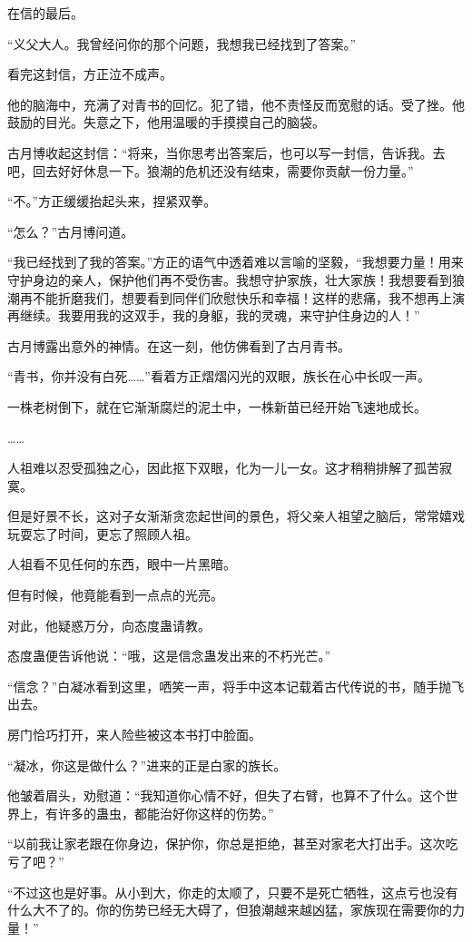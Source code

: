 \begin{this_body}
在信的最后。

“义父大人。我曾经问你的那个问题，我想我已经找到了答案。”

看完这封信，方正泣不成声。

他的脑海中，充满了对青书的回忆。犯了错，他不责怪反而宽慰的话。受了挫。他鼓励的目光。失意之下，他用温暖的手摸摸自己的脑袋。

古月博收起这封信：“将来，当你思考出答案后，也可以写一封信，告诉我。去吧，回去好好休息一下。狼潮的危机还没有结束，需要你贡献一份力量。”

“不。”方正缓缓抬起头来，捏紧双拳。

“怎么？”古月博问道。

“我已经找到了我的答案。”方正的语气中透着难以言喻的坚毅，“我想要力量！用来守护身边的亲人，保护他们再不受伤害。我想守护家族，壮大家族！我想要看到狼潮再不能折磨我们，想要看到同伴们欣慰快乐和幸福！这样的悲痛，我不想再上演再继续。我要用我的这双手，我的身躯，我的灵魂，来守护住身边的人！”

古月博露出意外的神情。在这一刻，他仿佛看到了古月青书。

“青书，你并没有白死……”看着方正熠熠闪光的双眼，族长在心中长叹一声。

一株老树倒下，就在它渐渐腐烂的泥土中，一株新苗已经开始飞速地成长。

……

人祖难以忍受孤独之心，因此抠下双眼，化为一儿一女。这才稍稍排解了孤苦寂寞。

但是好景不长，这对子女渐渐贪恋起世间的景色，将父亲人祖望之脑后，常常嬉戏玩耍忘了时间，更忘了照顾人祖。

人祖看不见任何的东西，眼中一片黑暗。

但有时候，他竟能看到一点点的光亮。

对此，他疑惑万分，向态度蛊请教。

态度蛊便告诉他说：“哦，这是信念蛊发出来的不朽光芒。”

“信念？”白凝冰看到这里，哂笑一声，将手中这本记载着古代传说的书，随手抛飞出去。

房门恰巧打开，来人险些被这本书打中脸面。

“凝冰，你这是做什么？”进来的正是白家的族长。

他皱着眉头，劝慰道：“我知道你心情不好，但失了右臂，也算不了什么。这个世界上，有许多的蛊虫，都能治好你这样的伤势。”

“以前我让家老跟在你身边，保护你，你总是拒绝，甚至对家老大打出手。这次吃亏了吧？”

“不过这也是好事。从小到大，你走的太顺了，只要不是死亡牺牲，这点亏也没有什么大不了的。你的伤势已经无大碍了，但狼潮越来越凶猛，家族现在需要你的力量！”


\end{this_body}
